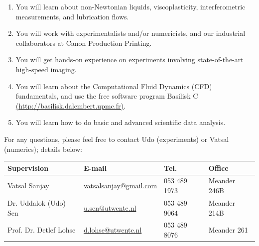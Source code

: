 \documentclass[a4paper,10pt]{article}
\begin{document}
\begin{enumerate}
\item You will learn about non-Newtonian liquids, viscoplasticity, interferometric measurements, and lubrication flows. 
\item You will work with experimentalists and/or numericists, and our industrial collaborators at Canon Production Printing. 
\item You will get hands-on experience on experiments involving state-of-the-art high-speed imaging.
\item You will learn about the Computational Fluid Dynamics (CFD) fundamentals, and use the free software program Basilisk C \href{http://basilisk.dalembert.upmc.fr}{(http://basilisk.dalembert.upmc.fr)}.
\item You will learn how to do basic and advanced scientific data analysis.
\end{enumerate}
For any questions, please feel free to contact Udo (experiments) or Vatsal (numerics); details below: 

\begin{center}
\begin{tabular}{|l|l|l|l|}
\hline \textbf{Supervision} & \textbf{E-mail} & \textbf{Tel.} & \textbf{Office} \\ 
\hline Vatsal Sanjay & \href{mailto:v.sanjay@utwente.nl}{vatsalsanjay@gmail.com} & 053 489 1973 & Meander 246B \\ 
\hline Dr. Uddalok (Udo) Sen & \href{mailto:u.sen@utwente.nl}{u.sen@utwente.nl} & 053 489 9064 & Meander 214B \\ 
\hline Prof. Dr. Detlef Lohse & \href{mailto:d.lohse@utwente.nl}{d.lohse@utwente.nl} & 053 489 8076 & Meander 261 \\ 
\hline 
\end{tabular} 
\end{center}



\end{document}
